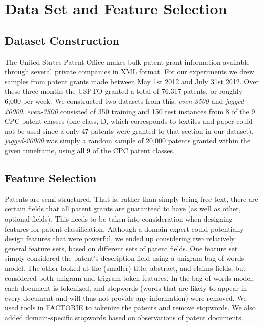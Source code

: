 \section{Data Set and Feature Selection}

\subsection{Dataset Construction}
The United States Patent Office makes bulk patent grant information available through several private companies\cite{USPTO:2013:patent-catalog} in XML format\cite{USPTO:2013:dtd}. For our experiments we drew samples from patent grants made between May 1st 2012 and July 31st 2012. Over these three months the USPTO granted a total of 76,317 patents, or roughly 6,000 per week. We constructed two datasets from this, \emph{even-3500} and \emph{jagged-20000}. \emph{even-3500} consisted of 350 training and 150 test instances from 8 of the 9 CPC patent classes (one class, D, which corresponds to textiles and paper could not be used since a only 47 patents were granted to that section in our dataset). \emph{jagged-20000} was simply a random sample of 20,000 patents granted within the given timeframe, using all 9 of the CPC patent classes.

\subsection{Feature Selection}
Patents are semi-structured. That is, rather than simply being free text, there are certain fields that all patent grants are guaranteed to have (as well as other, optional fields). This needs to be taken into consideration when designing features for patent classification. Although a domain expert could potentially design features that were powerful, we ended up considering two relatively general feature sets, based on different sets of patent fields. One feature set simply considered the patent's description field using a unigram bag-of-words model. The other looked at the (smaller) title, abstract, and claims fields, but considered both unigram and trigram token features. In the bag-of-words model, each document is tokenized, and stopwords (words that are likely to appear in every document and will thus not provide any information) were removed. We used tools in FACTORIE to tokenize the patents and remove stopwords. We also added domain-specific stopwords based on observations of patent documents. 
\indent

